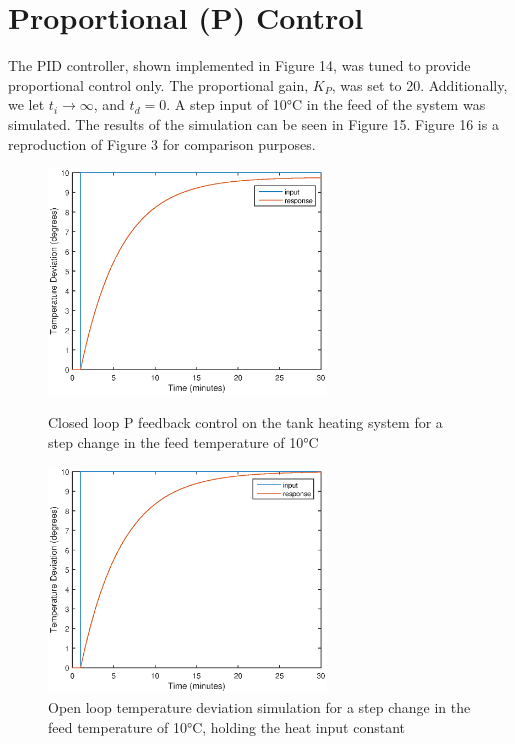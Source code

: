 \documentclass{article}
\begin{document}

\section{Proportional (P) Control}
The PID controller, shown implemented in Figure 14, was tuned to provide proportional control only. The proportional gain, $K_P$, was set to 20. Additionally, we let $t_i \rightarrow \infty$, and $t_d = 0$. A step input of 10$\si{\degreeCelsius}$ in the feed of the system was simulated. The results of the simulation can be seen in Figure 15. Figure 16 is a reproduction of Figure 3 for comparison purposes.
\begin{figure}[h]
\begin{minipage}{0.45\textwidth}
\centering
\includegraphics[height=6cm]{3_sim_P}
\caption{Closed loop P feedback control on the tank heating system for a step change in the feed temperature of 10$\si{\degreeCelsius}$}
\end{minipage}
\hspace{1cm}
\begin{minipage}{0.45\textwidth}
\centering
\includegraphics[height=6cm]{1a_sim}
\caption{Open loop temperature deviation simulation for a step change in the feed temperature of 10$\si{\degreeCelsius}$, holding the heat input constant}
\end{minipage}
\end{figure}
\end{document}
